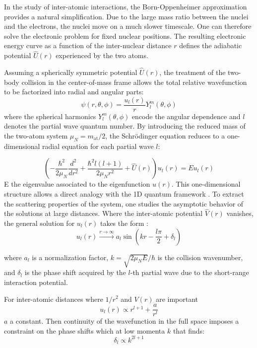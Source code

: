 In the study of inter-atomic interactions, the Born-Oppenheimer approximation provides a natural simplification. Due to the large mass ratio between the nuclei and the electrons,
 the nuclei move on a much slower timescale. One can therefore solve the electronic problem for fixed nuclear positions. The resulting electronic energy curve as a function of 
 the inter-nuclear distance $r$ defines the adiabatic potential $\hat{U}(r)$ experienced by the two atoms. 

Assuming a spherically symmetric potential $\hat{U}(r)$, the treatment of the two-body collision in the center-of-mass frame allows the total relative wavefunction to be 
factorized into radial and angular parts:
\begin{equation}
    \psi(r, \theta,\phi) = \frac{u_l(r)}{r} Y^m_l(\theta, \phi)
\end{equation}
where the spherical harmonics $Y^m_l(\theta, \phi)$ encode the angular dependence and $l$ denotes the partial wave quantum number. By introducing the reduced mass of the 
two-atom system $\mu_N = m_{\text{at}}/2$, 
the Schrödinger equation reduces to a one-dimensional radial equation for each partial wave $l$:

\begin{equation}
    \left( -\frac{\hbar^2}{2\mu_N} \frac{d^2}{dr^2} + \frac{\hbar^2 l(l+1)}{2\mu_N r^2} + \hat{U}(r) \right) u_l(r) = E u_l(r)
    \label{radial equation}
\end{equation}
E the eigenvalue associated to the eigenfunction $u(r)$.
This one-dimensional structure allows a direct analogy with the 1D quantum framework \cite{Landau}. To extract the scattering properties of the system, one studies the 
asymptotic behavior of the solutions at large 
distances. Where the inter-atomic potential $\hat{V}(r)$ vanishes, the general solution for $u_l(r)$ takes the form \cite{dalibard_interactions_nodate}:
\begin{equation}
    u_l(r) \xrightarrow{r\to\infty} a_l \sin\left(kr - \frac{l\pi}{2} + \delta_l\right)
    \label{solution at long r}
\end{equation}

where $a_l$ is a normalization factor, $k = \sqrt{2\mu_N E}/\hbar$ is the collision wavenumber, and $\delta_l$ is the phase shift acquired by the $l$-th partial wave due to the short-range interaction potential.

For inter-atomic distances where $1/r^2$ and $V(r)$ are important \cite{dalibard_interactions_nodate} 
\begin{equation}
    u_l(r) \propto r^{l+1} + \frac{a}{r^l}
\end{equation}
$a$ a constant. Then continuity of the wavefunction in the full space imposes a constraint on the phase shifts which at low momenta $k$ that finds:
 \begin{equation}
    \delta_l \propto k^{2l+1}
 \end{equation}

